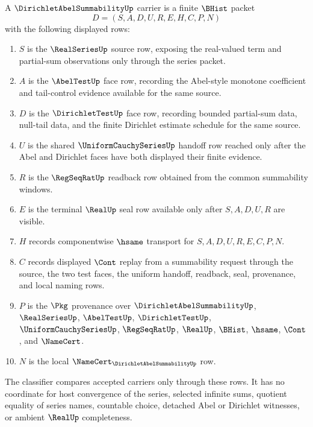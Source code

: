 \begin{definition}
\label{def:dirichlet-abel-summability-carrier}
A $\DirichletAbelSummabilityUp$ carrier is a finite $\BHist$ packet
$$
D=(S,A,D,U,R,E,H,C,P,N)
$$
with the following displayed rows:
\begin{enumerate}
\item $S$ is the $\RealSeriesUp$ source row, exposing the real-valued term and partial-sum observations only through the series packet.
\item $A$ is the $\AbelTestUp$ face row, recording the Abel-style monotone coefficient and tail-control evidence available for the same source.
\item $D$ is the $\DirichletTestUp$ face row, recording bounded partial-sum data, null-tail data, and the finite Dirichlet estimate schedule for the same source.
\item $U$ is the shared $\UniformCauchySeriesUp$ handoff row reached only after the Abel and Dirichlet faces have both displayed their finite evidence.
\item $R$ is the $\RegSeqRatUp$ readback row obtained from the common summability windows.
\item $E$ is the terminal $\RealUp$ seal row available only after $S,A,D,U,R$ are visible.
\item $H$ records componentwise $\hsame$ transport for $S,A,D,U,R,E,C,P,N$.
\item $C$ records displayed $\Cont$ replay from a summability request through the source, the two test faces, the uniform handoff, readback, seal, provenance, and local naming rows.
\item $P$ is the $\Pkg$ provenance over $\DirichletAbelSummabilityUp$, $\RealSeriesUp$, $\AbelTestUp$, $\DirichletTestUp$, $\UniformCauchySeriesUp$, $\RegSeqRatUp$, $\RealUp$, $\BHist$, $\hsame$, $\Cont$, and $\NameCert$.
\item $N$ is the local $\NameCert_{\DirichletAbelSummabilityUp}$ row.
\end{enumerate}
The classifier compares accepted carriers only through these rows. It has no coordinate for host convergence of the series, selected infinite sums, quotient equality of series names, countable choice, detached Abel or Dirichlet witnesses, or ambient $\RealUp$ completeness.
\end{definition}

